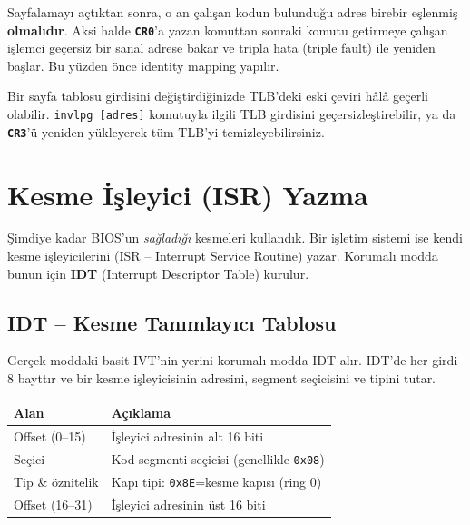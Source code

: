 \documentclass[11pt,a4paper]{article}
\newcommand{\reg}[1]{\texttt{\color{anaMavi}\textbf{#1}}}
\newcommand{\hx}[1]{\texttt{\color{turuncu}#1}}
\newcommand{\kod}[1]{\texttt{\color{koyuGri}#1}}
\begin{document}
\begin{uyarikutu}
Sayfalamayı açtıktan sonra, o an çalışan kodun bulunduğu adres birebir eşlenmiş
\textbf{olmalıdır}. Aksi halde \reg{CR0}'a yazan komuttan sonraki komutu getirmeye
çalışan işlemci geçersiz bir sanal adrese bakar ve tripla hata (triple fault)
ile yeniden başlar. Bu yüzden önce identity mapping yapılır.
\end{uyarikutu}

\begin{ipucukutu}
Bir sayfa tablosu girdisini değiştirdiğinizde TLB'deki eski çeviri hâlâ
geçerli olabilir. \kod{invlpg [adres]} komutuyla ilgili TLB girdisini
geçersizleştirebilir, ya da \reg{CR3}'ü yeniden yükleyerek tüm TLB'yi
temizleyebilirsiniz.
\end{ipucukutu}

\section{Kesme İşleyici (ISR) Yazma}

Şimdiye kadar BIOS'un \emph{sağladığı} kesmeleri kullandık. Bir işletim sistemi
ise kendi kesme işleyicilerini (ISR -- Interrupt Service Routine) yazar.
Korumalı modda bunun için \textbf{IDT} (Interrupt Descriptor Table) kurulur.

\subsection{IDT -- Kesme Tanımlayıcı Tablosu}

Gerçek moddaki basit IVT'nin yerini korumalı modda IDT alır. IDT'de her girdi
8 bayttır ve bir kesme işleyicisinin adresini, segment seçicisini ve tipini
tutar.

\begin{center}
\begin{tabularx}{\textwidth}{@{}l >{\raggedright\arraybackslash}X@{}}
\toprule
\rowcolor{acikMavi}\color{anaMavi}\textbf{Alan} & \color{anaMavi}\textbf{Açıklama} \\
\midrule
Offset (0--15) & İşleyici adresinin alt 16 biti \\
Seçici & Kod segmenti seçicisi (genellikle \hx{0x08}) \\
Tip \& öznitelik & Kapı tipi: \hx{0x8E}=kesme kapısı (ring 0) \\
Offset (16--31) & İşleyici adresinin üst 16 biti \\
\bottomrule
\end{tabularx}
\end{center}
\end{document}
